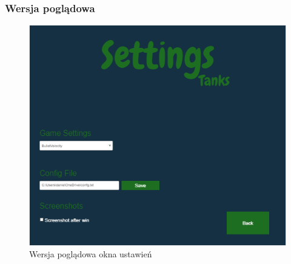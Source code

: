 \documentclass[11pt,a4paper]{report}
\begin{document}
\subsubsection{Wersja poglądowa}
\begin{figure}[!ht]
\centerline{\includegraphics{img/sett2.png}}
\caption{Wersja poglądowa okna ustawień}
\end{figure}
\newpage
\end{document}
